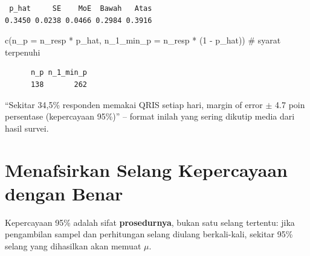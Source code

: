 \documentclass[
  indonesian,
  letterpaper,
]{book}
\newenvironment{Shaded}{\begin{snugshade}}{\end{snugshade}}
\newcommand{\AttributeTok}[1]{\textcolor[rgb]{0.40,0.45,0.13}{#1}}
\newcommand{\CommentTok}[1]{\textcolor[rgb]{0.37,0.37,0.37}{#1}}
\newcommand{\DecValTok}[1]{\textcolor[rgb]{0.68,0.00,0.00}{#1}}
\newcommand{\FunctionTok}[1]{\textcolor[rgb]{0.28,0.35,0.67}{#1}}
\newcommand{\NormalTok}[1]{\textcolor[rgb]{0.00,0.23,0.31}{#1}}
\newcommand{\SpecialCharTok}[1]{\textcolor[rgb]{0.37,0.37,0.37}{#1}}
\begin{document}
\begin{verbatim}
 p_hat     SE    MoE  Bawah   Atas 
0.3450 0.0238 0.0466 0.2984 0.3916 
\end{verbatim}

\begin{Shaded}
\begin{Highlighting}[]
\FunctionTok{c}\NormalTok{(}\AttributeTok{n\_p =}\NormalTok{ n\_resp }\SpecialCharTok{*}\NormalTok{ p\_hat, }\AttributeTok{n\_1\_min\_p =}\NormalTok{ n\_resp }\SpecialCharTok{*}\NormalTok{ (}\DecValTok{1} \SpecialCharTok{{-}}\NormalTok{ p\_hat))   }\CommentTok{\# syarat terpenuhi}
\end{Highlighting}
\end{Shaded}

\begin{verbatim}
      n_p n_1_min_p 
      138       262 
\end{verbatim}

``Sekitar 34,5\% responden memakai QRIS setiap hari, margin of error
\(\pm\) 4.7 poin persentase (kepercayaan 95\%)'' -- format inilah yang
sering dikutip media dari hasil survei.

\section{Menafsirkan Selang Kepercayaan dengan
Benar}\label{menafsirkan-selang-kepercayaan-dengan-benar}

Kepercayaan 95\% adalah sifat \textbf{prosedurnya}, bukan satu selang
tertentu: jika pengambilan sampel dan perhitungan selang diulang
berkali-kali, sekitar 95\% selang yang dihasilkan akan memuat \(\mu\).
\end{document}
